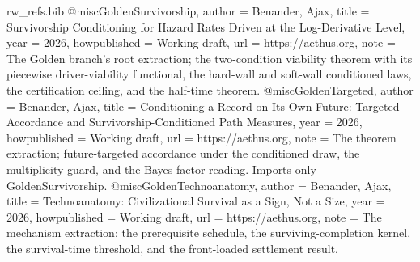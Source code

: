 \begin{filecontents}[overwrite]{rw_refs.bib}
@misc{GoldenSurvivorship,
  author       = {Benander, Ajax},
  title        = {Survivorship Conditioning for Hazard Rates Driven at the Log-Derivative Level},
  year         = {2026},
  howpublished = {Working draft},
  url          = {https://aethus.org},
  note         = {The Golden branch's root extraction; the two-condition viability
                  theorem with its piecewise driver-viability functional, the
                  hard-wall and soft-wall conditioned laws, the certification
                  ceiling, and the half-time theorem.}
}
@misc{GoldenTargeted,
  author       = {Benander, Ajax},
  title        = {Conditioning a Record on Its Own Future: Targeted Accordance and Survivorship-Conditioned Path Measures},
  year         = {2026},
  howpublished = {Working draft},
  url          = {https://aethus.org},
  note         = {The theorem extraction; future-targeted accordance under the
                  conditioned draw, the multiplicity guard, and the Bayes-factor
                  reading. Imports only GoldenSurvivorship.}
}
@misc{GoldenTechnoanatomy,
  author       = {Benander, Ajax},
  title        = {Technoanatomy: Civilizational Survival as a Sign, Not a Size},
  year         = {2026},
  howpublished = {Working draft},
  url          = {https://aethus.org},
  note         = {The mechanism extraction; the prerequisite schedule, the
                  surviving-completion kernel, the survival-time threshold, and the
                  front-loaded settlement result.}
}


\end{filecontents}
